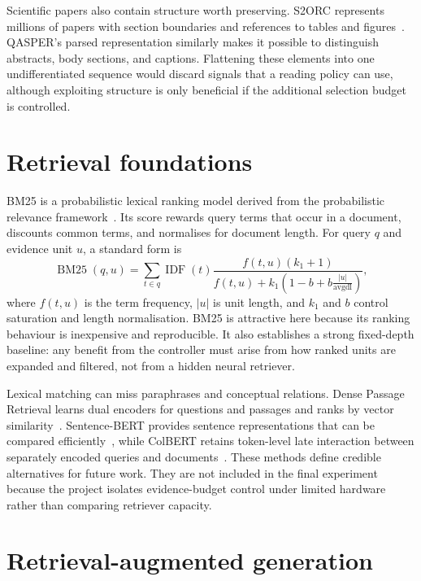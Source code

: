 Scientific papers also contain structure worth preserving. S2ORC represents millions of papers with section boundaries and references to tables and figures~\cite{lo2020s2orc}. QASPER's parsed representation similarly makes it possible to distinguish abstracts, body sections, and captions. Flattening these elements into one undifferentiated sequence would discard signals that a reading policy can use, although exploiting structure is only beneficial if the additional selection budget is controlled.

\section{Retrieval foundations}

BM25 is a probabilistic lexical ranking model derived from the probabilistic relevance framework~\cite{robertson2009bm25}. Its score rewards query terms that occur in a document, discounts common terms, and normalises for document length. For query $q$ and evidence unit $u$, a standard form is
\begin{equation}
\operatorname{BM25}(q,u)=\sum_{t\in q}
\operatorname{IDF}(t)
\frac{f(t,u)(k_1+1)}{f(t,u)+k_1\left(1-b+b\frac{|u|}{\operatorname{avgdl}}\right)},
\end{equation}
where $f(t,u)$ is the term frequency, $|u|$ is unit length, and $k_1$ and $b$ control saturation and length normalisation. BM25 is attractive here because its ranking behaviour is inexpensive and reproducible. It also establishes a strong fixed-depth baseline: any benefit from the controller must arise from how ranked units are expanded and filtered, not from a hidden neural retriever.

Lexical matching can miss paraphrases and conceptual relations. Dense Passage Retrieval learns dual encoders for questions and passages and ranks by vector similarity~\cite{karpukhin2020dpr}. Sentence-BERT provides sentence representations that can be compared efficiently~\cite{reimers2019sbert}, while ColBERT retains token-level late interaction between separately encoded queries and documents~\cite{khattab2020colbert}. These methods define credible alternatives for future work. They are not included in the final experiment because the project isolates evidence-budget control under limited hardware rather than comparing retriever capacity.

\section{Retrieval-augmented generation}

